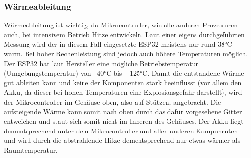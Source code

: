 \documentclass[11pt, twoside]{article}
\begin{document}
\subsubsection{Wärmeableitung}
Wärmeableitung ist wichtig, da Mikrocontroller, wie alle anderen Prozessoren auch, bei intensivem Betrieb Hitze entwickeln. Laut einer eigens durchgeführten Messung wird der in diesem Fall eingesetzte ESP32 meistens nur rund 38°C warm. Bei hoher Rechenleistung sind jedoch auch höhere Temperaturen möglich. Der ESP32 hat laut Hersteller eine mögliche Betriebstemperatur (Umgebungstemperatur) von –40°C bis +125°C. Damit die entstandene Wärme gut ableiten kann und keine der Komponenten stark beeinflusst (vor allem den Akku, da dieser bei hohen Temperaturen eine Explosionsgefahr darstellt), wird der Mikrocontroller im Gehäuse oben, also auf Stützen, angebracht. Die aufsteigende Wärme kann somit nach oben durch das dafür vorgesehene Gitter entweichen und staut sich somit nicht im Inneren des Gehäuses. Der Akku liegt dementsprechend unter dem Mikrocontroller und allen anderen Komponenten und wird durch die abstrahlende Hitze dementsprechend nur etwas wärmer als Raumtemperatur.
\vspace{4mm}\newline
\parencite[vgl.][]{noauthor_urlnl06_nodate}
\end{document}
